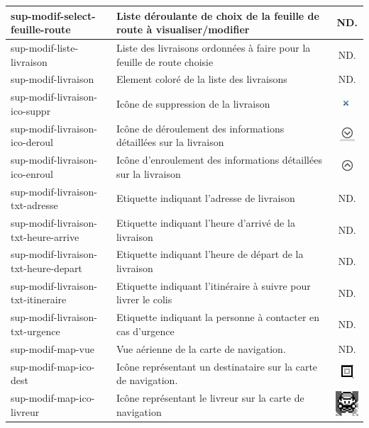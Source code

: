 \documentclass{report}
\begin{document}
\begin{longtable}{|p{5cm}|p{5cm}|c|}
sup-modif-select-feuille-route&Liste déroulante de choix de la feuille de route à visualiser/modifier&ND.\\\hline
sup-modif-liste-livraison&Liste des livraisons ordonnées à faire pour la feuille de route choisie&ND.\\\hline
sup-modif-livraison&Element coloré de la liste des livraisons&ND.\\\hline
sup-modif-livraison-ico-suppr&Icône de suppression de la livraison&\includegraphics{images/gestion-suppr.jpg}\\\hline
sup-modif-livraison-ico-deroul&Icône de déroulement des informations détaillées sur la livraison&\includegraphics{images/gestion-deroul.jpg}\\\hline
sup-modif-livraison-ico-enroul&Icône d'enroulement des informations détaillées sur la livraison&\includegraphics{images/gestion-enroul.jpg}\\\hline
sup-modif-livraison-txt-adresse&Etiquette indiquant l'adresse de livraison&ND.\\\hline
sup-modif-livraison-txt-heure-arrive&Etiquette indiquant l'heure d'arrivé de la livraison&ND.\\\hline
sup-modif-livraison-txt-heure-depart&Etiquette indiquant l'heure de départ de la livraison&ND.\\\hline
sup-modif-livraison-txt-itineraire&Etiquette indiquant l'itinéraire à suivre pour livrer le colis&ND.\\\hline
sup-modif-livraison-txt-urgence&Etiquette indiquant la personne à contacter en cas d'urgence&ND.\\\hline
sup-modif-map-vue&Vue aérienne de la carte de navigation.&ND.\\\hline
sup-modif-map-ico-dest&Icône représentant un destinataire sur la carte de navigation.&\includegraphics{images/ico-liv-dest.jpg}\\\hline
sup-modif-map-ico-livreur&Icône représentant le livreur sur la carte de navigation&\includegraphics{images/ico-liv-pos.jpg}\\\hline

\end{longtable}
\end{document}
